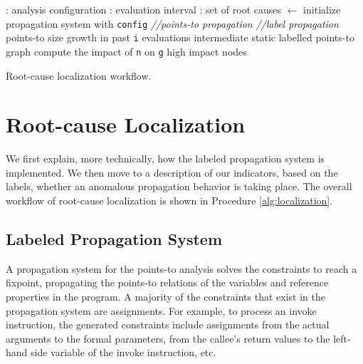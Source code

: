 \begin{algorithm}[th!]
	\begin{algorithmic}[1]
		{
			\renewcommand{\algorithmicrequire}{\textbf{Input:}}
			\renewcommand{\algorithmicensure}{\textbf{Output:}}
			: analysis configuration
			: evaluation interval
			: set of root causes
			 $\leftarrow$ initialize propagation system with {\tt config}
			 {\it //points-to propagation}
			 {\it //label propagation}
			\ENDFOR
			 points-to size growth in past {\tt i} evaluations
			 intermediate static labelled points-to graph
			 compute the impact of {\tt n} on {\tt g}
			\ENDFOR
			 high impact nodes
			\RETURN
			\ENDIF
			\ENDIF
			\ENDWHILE
		}
	\end{algorithmic}
	\caption{Root-cause localization workflow.}
	\label{alg:localization}
\end{algorithm}

\section{Root-cause Localization}\label{Se:RootCause}

We first explain, more technically, how the labeled propagation system is implemented. We then move to a description of our indicators, based on the labels, whether an anomalous propagation behavior is taking place. The overall workflow of root-cause localization is shown in Procedure \ref{alg:localization}.

\subsection{Labeled Propagation System}

A propagation system for the points-to analysis solves the constraints to reach a fixpoint, propagating the points-to relations of the variables and reference properties in the program. A majority of the constraints that exist in the propagation system are assignments. For example, to process an invoke instruction, the generated constraints include assignments from the actual arguments to the formal parameters, from the callee's return values to the left-hand side variable of the invoke instruction, etc. 

